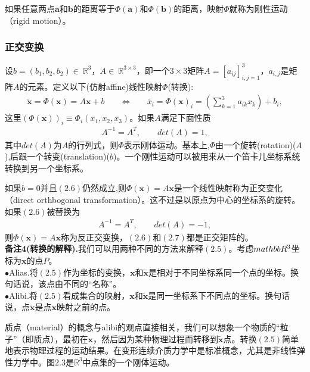 如果任意两点$\mathbf{a}$和$\mathbf{b}$的距离等于$\Phi(\mathbf{a})$和$\Phi(\mathbf{b})$的距离，映射$\Phi$就称为刚性运动（rigid motion）。

\subsubsection{正交变换}
设$b = (b_1, b_2, b_2)\in~\mathbb{R}^3$，$A\in~\mathbb{R}^{3\times 3}$，即一个$3\times 3$矩阵$A=[a_{ij}]_{i,j=1}^3$，$a_{i,j}$是矩阵$A$的元素。定义以下(仿射affine)线性映射$\Phi$(转换):
\begin{gather}
\tilde{\mathbf{x}}=\Phi (\mathbf{x})=A\mathbf{x}+b~~~~~~~~\Leftrightarrow~~~~~~~~\tilde{x_i}=\Phi (\mathbf{x})_i=\left( \sum _{k=1}^{3}a_{ik}x_{k} \right)+b_i,
\end{gather}
这里$(\Phi(\mathbf{x}))_i\equiv \Phi _i(x_1,x_2,x_3)$。如果$A$满足下面性质
\begin{gather}
A^{-1}=A^{T},~~~~~~~~~det(A)=1,
\end{gather}
其中$det(A)$为$A$的行列式，则$\Phi$表示刚体运动。基本上,$\Phi$由一个旋转(rotation)($A$),后跟一个转变(translation)($b$)。一个刚性运动可以被用来从一个笛卡儿坐标系统转换到另一个坐标系。

如果$b=0$并且$(2.6)$仍然成立,则$\Phi(\mathbf{x})=A\mathbf{x}$是一个线性映射称为正交变化（direct orthbogonal transformation）。这不过是以原点为中心的坐标系的旋转。如果$(2.6)$被替换为
\begin{gather}
A^{-1}=A^{T},~~~~~~~~~det(A)=-1,
\end{gather}
则$\Phi(\mathbf{x})=A\mathbf{x}$称为反正交变换，$(2.6)$和$(2.7)$都是正交矩阵的。\\

\textbf{备注4(转换的解释).}我们可以用两种不同的方法来解释$(2.5)$。考虑$\\mathbb{R}^3$坐标为$\mathbf{x}$的点$P$。\\

$\bullet$Alias.将$(2.5)$作为坐标的变换，$\mathbf{x}$和$\tilde{\mathbf{x}}$是相对于不同坐标系同一个点的坐标。换句话说，该点由不同的“名称”。\\

$\bullet$Alibi.将$(2.5)$看成集合的映射，$\mathbf{x}$和$\tilde{\mathbf{x}}$是同一坐标系下不同点的坐标。换句话说，点$\tilde{\mathbf{x}}$是点$\mathbf{x}$映射之前的点。

质点（material）的概念与alibi的观点直接相关，我们可以想象一个物质的“粒子”（即质点），最初在$\mathbf{x}$，然后因为某种物理过程而转移到$\tilde{\mathbf{x}}$点。转换$(2.5)$简单地表示物理过程的运动结果。在变形连续介质力学中是标准概念，尤其是非线性弹性力学中。图$2.3$是$\mathbb{R}^3$中点集的一个刚体运动。

